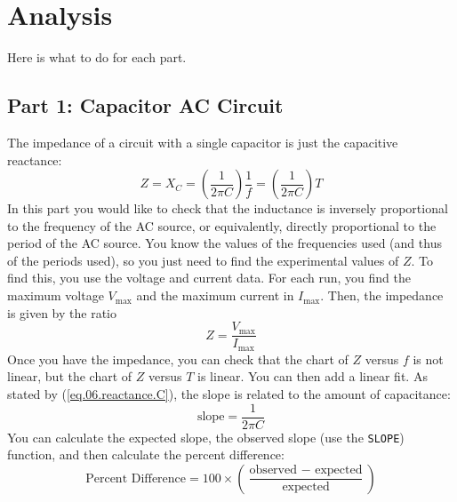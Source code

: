\section{Analysis}
%
Here is what to do for each part.
%
\subsection{Part 1: Capacitor AC Circuit}
%
The impedance of a circuit with a single capacitor is just the capacitive reactance:
\begin{equation}
	Z = X_{C} = \left(\frac{1}{2 \pi C}\right) \frac{1}{f} = \left(\frac{1}{2 \pi C}\right) T
\end{equation}
In this part you would like to check that the inductance is inversely proportional to the frequency of the AC source, or equivalently, directly proportional to the period of the AC source. You know the values of the frequencies used (and thus of the periods used), so you just need to find the experimental values of $Z$. To find this, you use the voltage and current data. For each run, you find the maximum voltage $V_{\text{max}}$ and the maximum current in $I_{\text{max}}$. Then, the impedance is given by the ratio
\begin{equation}
	Z = \frac{V_{\text{max}}}{I_{\text{max}}}
\end{equation}
Once you have the impedance, you can check that the chart of $Z$ versus $f$ is not linear, but the chart of $Z$ versus $T$ is linear. You can then add a linear fit. As stated by (\ref{eq.06.reactance.C}), the slope is related to the amount of capacitance:
\begin{equation}
	\text{slope} = \frac{1}{2 \pi C}
\end{equation}
You can calculate the expected slope, the observed slope (use the \texttt{SLOPE}) function, and then calculate the percent difference:
\begin{equation}
	\text{Percent Difference} = 100 \times \left( \frac{\text{observed } - \text{ expected}}{\text{expected}} \right)
\end{equation}
%
